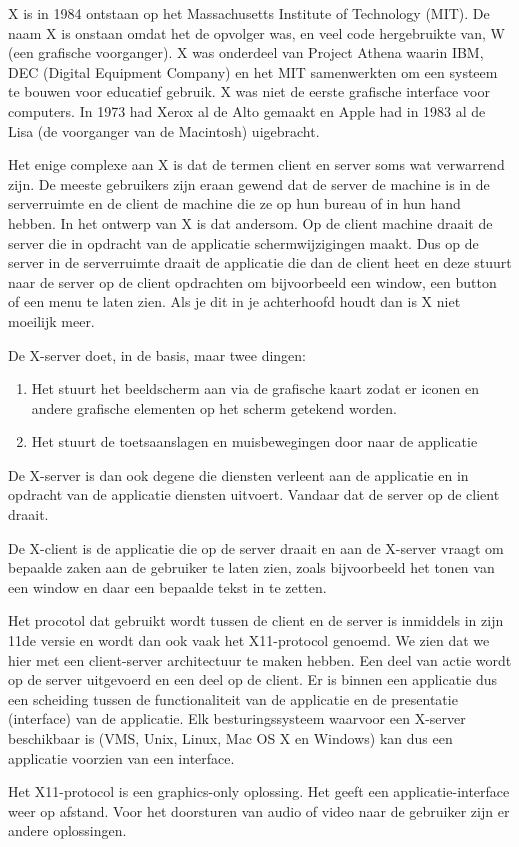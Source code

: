 X is in 1984 ontstaan op het Massachusetts Institute of Technology (MIT). De naam X is onstaan omdat het de opvolger was, en veel code hergebruikte van, W (een grafische voorganger). X was onderdeel van Project Athena waarin IBM, DEC (Digital Equipment Company) en het MIT samenwerkten om een systeem te bouwen voor educatief gebruik. X was niet de eerste grafische interface voor computers. In 1973 had Xerox al de Alto gemaakt en Apple had in 1983 al de Lisa (de voorganger van de Macintosh) uigebracht.

Het enige complexe aan X is dat de termen client en server soms wat verwarrend zijn. De meeste gebruikers zijn eraan gewend dat de server de machine is in de serverruimte en de client de machine die ze op hun bureau of in hun hand hebben. In het ontwerp van X is dat andersom. Op de client machine draait de server die in opdracht van de applicatie schermwijzigingen maakt. Dus op de server in de serverruimte draait de applicatie die dan de client heet en deze stuurt naar de server op de client opdrachten om bijvoorbeeld een window, een button of een menu te laten zien. Als je dit in je achterhoofd houdt dan is X niet moeilijk meer.

De X-server doet, in de basis, maar twee dingen:
\begin{enumerate}
\item Het stuurt het beeldscherm aan via de grafische kaart zodat er iconen en andere grafische elementen op het scherm getekend worden.
\item Het stuurt de toetsaanslagen en muisbewegingen door naar de applicatie
\end{enumerate}
De X-server is dan ook degene die diensten verleent aan de applicatie en in opdracht van de applicatie diensten uitvoert. Vandaar dat de server op de client draait.

De X-client is de applicatie die op de server draait en aan de X-server vraagt om bepaalde zaken aan de gebruiker te laten zien, zoals bijvoorbeeld het tonen van een window en daar een bepaalde tekst in te zetten.

Het procotol dat gebruikt wordt tussen de client en de server is inmiddels in zijn 11de versie en wordt dan ook vaak het X11-protocol genoemd. We zien dat we hier met een client-server architectuur te maken hebben. Een deel van actie wordt op de server uitgevoerd en een deel op de client. Er is binnen een applicatie dus een scheiding tussen de functionaliteit van de applicatie en de presentatie (interface) van de applicatie. Elk besturingssysteem waarvoor een X-server beschikbaar is (VMS, Unix, Linux, Mac OS X en Windows) kan dus een applicatie voorzien van een interface.

Het X11-protocol is een graphics-only oplossing. Het geeft een applicatie-interface weer op afstand. Voor het doorsturen van audio of video naar de gebruiker zijn er andere oplossingen.
